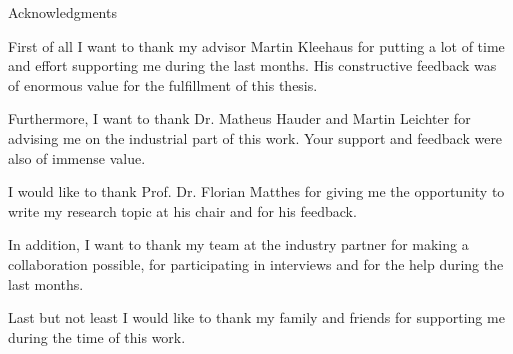 \thispagestyle{empty}

\vspace*{20mm}

\begin{center}
{ Acknowledgments}
\end{center}

\vspace{10mm}


First of all I want to thank my advisor Martin Kleehaus for putting a lot of time and effort supporting me during the last months. His constructive feedback was of enormous value for the fulfillment of this thesis.

Furthermore, I want to thank Dr. Matheus Hauder and Martin Leichter for advising me on the industrial part of this work. Your support and feedback were also of immense value. 


I would like to thank Prof. Dr. Florian Matthes for giving me the opportunity to write my research topic at his chair and for his feedback.

In addition, I want to thank my team at the industry partner for making a collaboration possible, for participating in interviews and for the help during the last months.

Last but not least I would like to thank my family and friends for supporting me during the time of this work.

\cleardoublepage{}
